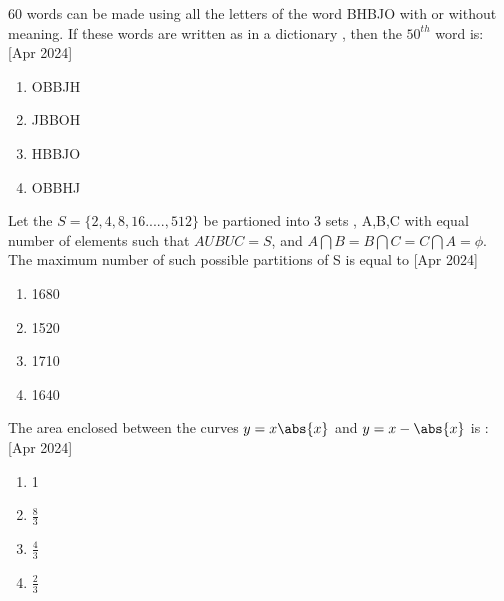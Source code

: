
\iffalse
  \title{2024}
  \author{ai24btech11005}
  \section{mcq-single}
\fi



    \item 60 words can be made using all the letters of the word BHBJO with or without meaning. If these words are written as in a dictionary , then the $50^{th}$ word is:
    \hfill{[Apr 2024]}
        \begin{multicols}{4}
            \begin{enumerate}
                \item OBBJH
                \item JBBOH
                \item HBBJO
                \item OBBHJ
            \end{enumerate}
        \end{multicols}

    \item Let the $S=\{2,4,8,16.....,512\}$ be partioned into 3 sets , A,B,C with equal number of elements such that $AUBUC=S$, and $A \bigcap B=B \bigcap C=C \bigcap A=\phi$. The maximum number of such possible partitions of S is equal to
     \hfill{[Apr 2024]}


		\begin{multicols}{4}
			\begin{enumerate}
				\item 1680
				\item  1520
				\item 1710
				\item  1640
			\end{enumerate}
		\end{multicols}

    \item The area enclosed between the curves $y=x\abs{x}$ and $y=x-\abs{x}$ is  :
      \hfill{[Apr 2024]}
        \begin{multicols}{4}
            \begin{enumerate}
              \item 1
              \item $\frac{8}{3}$
              \item $\frac{4}{3}$
              \item $\frac{2}{3}$
            \end{enumerate}
        \end{multicols}

